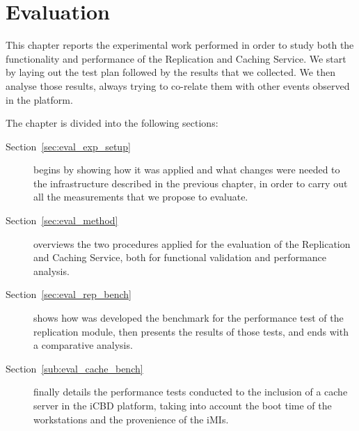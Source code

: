 \chapter{Evaluation}
\label{cha:evaluation}


This chapter reports the experimental work performed in order to study both the functionality and performance of the Replication and Caching Service. We start by laying out the test plan followed by the results that we collected. We then analyse those results, always trying to co-relate them with other events observed in the platform.

The chapter is divided into the following sections:

\begin{description}
    \item [Section~\ref{sec:eval_exp_setup}] begins by showing how it was applied and what changes were needed to the infrastructure described in the previous chapter, in order to carry out all the measurements that we propose to evaluate.
    \item [Section~\ref{sec:eval_method}] overviews the two procedures applied for the evaluation of the Replication and Caching Service, both for functional validation and performance analysis.
    \item [Section~\ref{sec:eval_rep_bench}] shows how was developed the benchmark for the performance test of the replication module, then presents the results of those tests, and ends with a comparative analysis.
    \item [Section~\ref{sub:eval_cache_bench}] finally details the performance tests conducted to the inclusion of a cache server in the iCBD platform, taking into account the boot time of the workstations and the provenience of the iMIs.
\end{description}

\newpage

